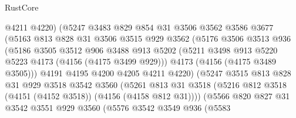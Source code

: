 \begin{lexlean}{RustCore}
\begin{coremodule}
                            @4211
                            @4220)
                          (@5247
                            @3483
                            @829
                            @854
                            @31
                            @3506
                            @3562
                            @3586
                            @3677
                            (@5163
                              @813
                              @828
                              @31
                              @3506
                              @3515
                              @929
                              @3562
                              (@5176
                                @3506
                                @3513
                                @936
                                (@5186
                                  @3505
                                  @3512
                                  @906
                                  @3488
                                  @913
                                  @5202
                                  (@5211 @3498 @913 @5220 @5223 @4173 (@4156 (@4175 @3499 @929)))
                                  @4173
                                  (@4156 (@4175 @3489 @3505)))
                                @4191
                                @4195
                                @4200
                                @4205
                                @4211
                                @4220)
                              (@5247
                                @3515
                                @813
                                @828
                                @31
                                @929
                                @3518
                                @3542
                                @3560
                                (@5261
                                  @813
                                  @31
                                  @3518
                                  (@5216 @812 @3518 (@4151 (@4152 @3518)) (@4156 (@4158 @812 @31))))
                                (@5566
                                  @820
                                  @827
                                  @31
                                  @3542
                                  @3551
                                  @929
                                  @3560
                                  (@5576
                                    @3542
                                    @3549
                                    @936
                                    (@5583

\end{coremodule}
\end{lexlean}
